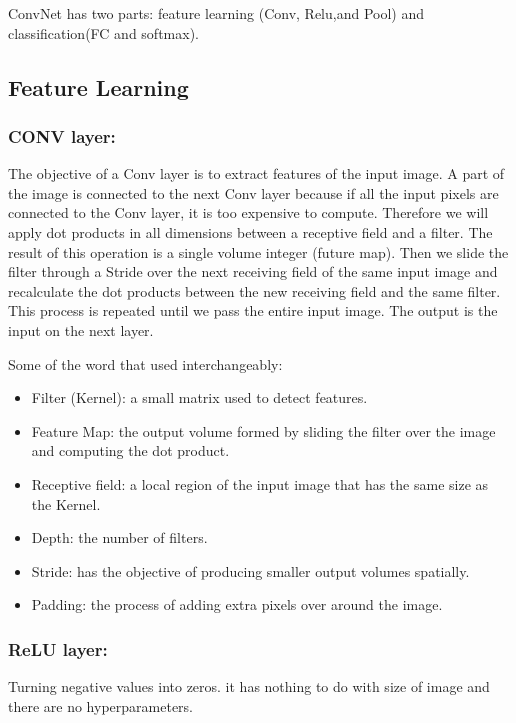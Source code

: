 \documentclass[12pt]{report}
\begin{document}
ConvNet has two parts: feature learning (Conv, Relu,and Pool) and classification(FC and softmax).

\subsection{Feature Learning}
    \subsubsection{CONV layer:}
        The objective of a Conv layer is to extract features of the input image.
        A part of the image is connected to the next Conv layer because if all the 
        input pixels are connected to the Conv layer, it is too expensive to compute. 
        Therefore we will apply dot products in all dimensions between a receptive 
        field and a filter. The result of this operation is a single volume integer (future map).
        Then we slide the filter through a Stride over the next receiving field of the same input 
        image and recalculate the dot products between the new receiving field and the same filter.
        This process is repeated until we pass the entire input image. The output is the input on the next layer.

        Some of the word that used interchangeably:
        \begin{itemize}
            \item Filter (Kernel): a small matrix used to detect features.
            \item Feature Map: the output volume formed by sliding the filter over the image and computing the dot product.
            \item Receptive field: a local region of the input image that has the same size as the Kernel.
            \item Depth: the number of filters.
            \item Stride: has the objective of producing smaller output volumes spatially.
            \item Padding: the process of adding extra pixels over around the image.
        \end{itemize}

    \subsubsection{ReLU layer:}
        Turning negative values into zeros. it has nothing to do with size of image and there are no hyperparameters.
\end{document}
